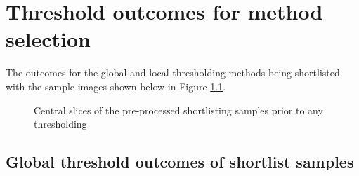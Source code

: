 \chapter{Threshold outcomes for method selection}
\makeatletter{}\makeatother
The outcomes for the global and local thresholding methods being shortlisted with the sample images shown below in Figure \ref{appen-fig:shortlist_samples}.

\begin{figure}[ht!]
	\centering
	\caption{Central slices of the pre-processed shortlisting samples prior to any thresholding}
	\label{appen-fig:shortlist_samples}
\end{figure}
\FloatBarrier
\section{Global threshold outcomes of shortlist samples}\label{appen_sec:global_shortlist}

